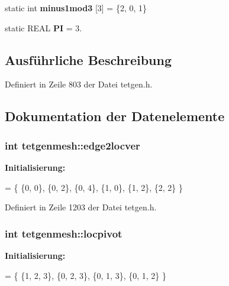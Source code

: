 \begin{DoxyCompactItemize}
\item 
\hypertarget{classtetgenmesh_a1cb441a524c4fac614d31740c48637a4}{static int {\bfseries minus1mod3} \mbox{[}3\mbox{]} = \{2, 0, 1\}}\label{classtetgenmesh_a1cb441a524c4fac614d31740c48637a4}

\item 
\hypertarget{classtetgenmesh_ad6766e0d2dbbf0a642793fbd6ef98ae2}{static R\-E\-A\-L {\bfseries P\-I} = 3.}\label{classtetgenmesh_ad6766e0d2dbbf0a642793fbd6ef98ae2}

\end{DoxyCompactItemize}


\subsection{Ausführliche Beschreibung}


Definiert in Zeile 803 der Datei tetgen.\-h.



\subsection{Dokumentation der Datenelemente}
\hypertarget{classtetgenmesh_a5d635c8c2064170ca231e2f6fc0a4769}{
\subsubsection[{edge2locver}]{\setlength{\rightskip}{0pt plus 5cm}int tetgenmesh\-::edge2locver\hspace{0.3cm}{\ttfamily [static]}}}\label{classtetgenmesh_a5d635c8c2064170ca231e2f6fc0a4769}
{\bfseries Initialisierung\-:}
\begin{DoxyCode}
= \{
  \{0, 0\}, 
  \{0, 2\}, 
  \{0, 4\}, 
  \{1, 0\}, 
  \{1, 2\}, 
  \{2, 2\}  
\}
\end{DoxyCode}


Definiert in Zeile 1203 der Datei tetgen.\-h.

\hypertarget{classtetgenmesh_ad645adfa7d72fb5a78e40856eae11a81}{
\subsubsection[{locpivot}]{\setlength{\rightskip}{0pt plus 5cm}int tetgenmesh\-::locpivot\hspace{0.3cm}{\ttfamily [static]}}}\label{classtetgenmesh_ad645adfa7d72fb5a78e40856eae11a81}
{\bfseries Initialisierung\-:}
\begin{DoxyCode}
= \{
  \{1, 2, 3\},
  \{0, 2, 3\},
  \{0, 1, 3\},
  \{0, 1, 2\}
\}
\end{DoxyCode}


